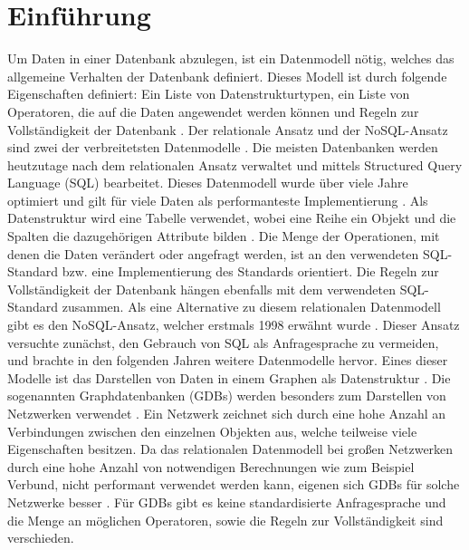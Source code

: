
\chapter{Einführung} %

\label{Kaptiel1} %


\newcommand{\keyword}[1]{\textit{#1}}
\newcommand{\tabhead}[1]{\textbf{#1}}
\newcommand{\code}[1]{\texttt{#1}}
\newcommand{\file}[1]{\texttt{\bfseries#1}}
\newcommand{\option}[1]{\texttt{\itshape#1}}

Um Daten in einer Datenbank abzulegen, ist ein Datenmodell nötig, welches das allgemeine Verhalten der Datenbank definiert. Dieses Modell ist durch folgende Eigenschaften definiert: Ein Liste von Datenstrukturtypen, ein Liste von Operatoren, die auf die Daten angewendet werden können und Regeln zur Vollständigkeit der Datenbank \parencite{codd1981data}. Der relationale Ansatz und der NoSQL-Ansatz sind zwei der verbreitetsten Datenmodelle \parencite{vicknair2010comparison}. \newline
Die meisten Datenbanken werden heutzutage nach dem relationalen Ansatz verwaltet und mittels Structured Query Language (SQL) bearbeitet. Dieses Datenmodell wurde über viele Jahre optimiert und gilt für viele Daten als performanteste Implementierung \parencite{miller2013graph}. Als Datenstruktur wird eine Tabelle verwendet, wobei eine Reihe ein Objekt  und die Spalten die dazugehörigen Attribute bilden \parencite{tatarinov2002storing}. Die Menge der Operationen, mit denen die Daten verändert oder angefragt werden, ist an den verwendeten SQL-Standard bzw. eine Implementierung des Standards orientiert. Die Regeln zur Vollständigkeit der Datenbank hängen ebenfalls mit dem verwendeten SQL-Standard zusammen.  \newline 
Als eine Alternative zu diesem relationalen Datenmodell gibt es den NoSQL-Ansatz, welcher erstmals 1998 erwähnt wurde \parencite{strauch2011nosql}. Dieser Ansatz versuchte zunächst, den Gebrauch von SQL als Anfragesprache zu vermeiden, und brachte in den folgenden Jahren weitere Datenmodelle hervor. Eines dieser Modelle ist das Darstellen von Daten in einem Graphen als Datenstruktur \parencite{miller2013graph}. Die sogenannten Graphdatenbanken (GDBs) werden besonders zum Darstellen von Netzwerken verwendet \parencite{han2011survey}. Ein Netzwerk zeichnet sich durch eine hohe Anzahl an Verbindungen zwischen den einzelnen Objekten aus, welche teilweise viele Eigenschaften besitzen. Da das relationalen Datenmodell bei großen Netzwerken durch eine hohe Anzahl von notwendigen Berechnungen wie zum Beispiel Verbund, nicht performant verwendet werden kann, eigenen sich GDBs für solche Netzwerke besser \parencite{miller2013graph}. Für GDBs gibt es keine standardisierte Anfragesprache und  die Menge an möglichen Operatoren, sowie die Regeln zur Vollständigkeit sind verschieden.
